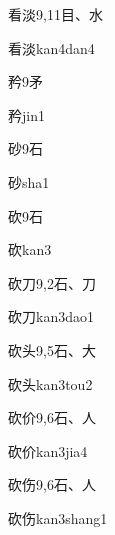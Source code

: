 \begin{entry}{看淡}{9,11}{⽬、⽔}
  \begin{phonetics}{看淡}{kan4dan4}
  \end{phonetics}
\end{entry}

\begin{entry}{矜}{9}{⽭}
  \begin{phonetics}{矜}{jin1}
  \end{phonetics}
\end{entry}

\begin{entry}{砂}{9}{⽯}
  \begin{phonetics}{砂}{sha1}
  \end{phonetics}
\end{entry}

\begin{entry}{砍}{9}{⽯}
  \begin{phonetics}{砍}{kan3}
  \end{phonetics}
\end{entry}

\begin{entry}{砍刀}{9,2}{⽯、⼑}
  \begin{phonetics}{砍刀}{kan3dao1}
  \end{phonetics}
\end{entry}

\begin{entry}{砍头}{9,5}{⽯、⼤}
  \begin{phonetics}{砍头}{kan3tou2}
  \end{phonetics}
\end{entry}

\begin{entry}{砍价}{9,6}{⽯、⼈}
  \begin{phonetics}{砍价}{kan3jia4}
  \end{phonetics}
\end{entry}

\begin{entry}{砍伤}{9,6}{⽯、⼈}
  \begin{phonetics}{砍伤}{kan3shang1}
  \end{phonetics}
\end{entry}

